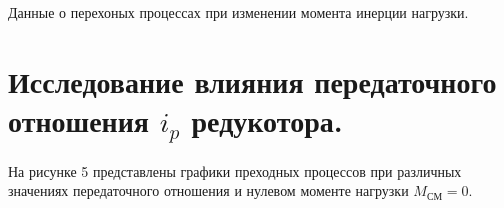 \documentclass[a4paper, 11pt]{article}
\begin{document}
\begin{table}[h!]
    \centering
    \caption{Данные о перехоных процессах при изменении момента инерции нагрузки.}
\end{table}

\newpage

\section*{Исследование влияния передаточного отношения $i_p$ редукотора.}
На рисунке 5 представлены графики преходных процессов при различных значениях передаточного отношения и нулевом моменте нагрузки $M_\text{СМ} = 0$.
\end{document}
